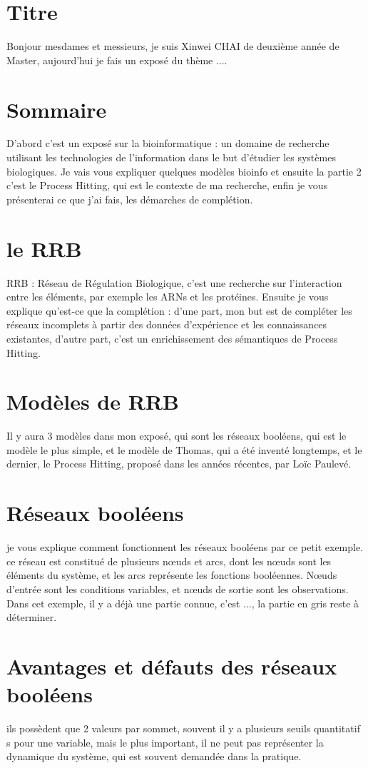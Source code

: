 \documentclass[french,12pt]{article}
\begin{document}
\section{Titre}
Bonjour mesdames et messieurs, je suis Xinwei CHAI de deuxième année de Master, aujourd'hui je fais un exposé du thème ....
\section{Sommaire}
D'abord c'est un exposé sur la bioinformatique : un domaine de recherche utilisant les technologies de l'information dans le but d'étudier les systèmes biologiques. Je vais vous expliquer quelques modèles bioinfo et ensuite la partie 2 c'est le Process Hitting, qui est le contexte de ma recherche, enfin je vous présenterai ce que j'ai fais, les démarches de complétion. 
\section{le RRB}
RRB : Réseau de Régulation Biologique, c'est une recherche sur l'interaction entre les éléments, par exemple les ARNs et les protéines. Ensuite je vous explique qu'est-ce que la complétion : d'une part, mon but est de compléter les réseaux incomplets à partir des données d'expérience et les connaissances existantes, d'autre part, c'est un enrichissement des sémantiques de Process Hitting.
\section{Modèles de RRB}
Il y aura 3 modèles dans mon exposé, qui sont les réseaux booléens, qui est le modèle le plus simple, et le modèle de Thomas, qui a été inventé longtemps, et le dernier, le Process Hitting, proposé dans les années récentes, par Loïc Paulevé.
\section{Réseaux booléens}
je vous explique comment fonctionnent les réseaux booléens par ce petit exemple. ce réseau est constitué de plusieurs nœuds et arcs, dont les nœuds sont les éléments du système, et les arcs représente les fonctions booléennes. Nœuds d'entrée sont les conditions variables, et nœuds de sortie sont les observations. Dans cet exemple, il y a déjà une partie connue, c'est ..., la partie en gris reste à déterminer.
\section{Avantages et défauts des réseaux booléens}
ils possèdent que 2 valeurs par sommet, souvent il y a plusieurs seuils quantitatif s pour une variable, mais le plus important, il ne peut pas représenter la dynamique du système, qui est souvent demandée dans la pratique.
\end{document}
